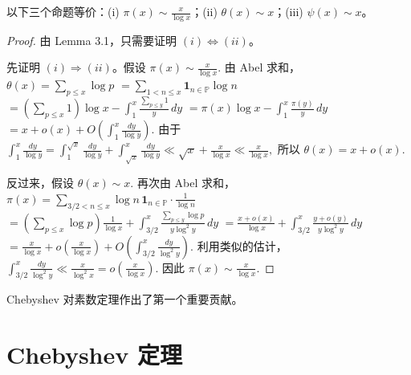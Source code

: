 \begin{theorem}[原文 Theorem 3.2]
	以下三个命题等价：(i) $\pi(x)\sim \frac{x}{\log x}$；(ii) $\theta(x)\sim x$；(iii) $\psi(x)\sim x$。
\end{theorem}

\begin{proof}
	由 Lemma 3.1，只需要证明 $(i)\Longleftrightarrow(ii)$。

	先证明 $(i)\Rightarrow(ii)$。假设
	\(\textstyle \pi(x)\sim\allowbreak{} \frac{x}{\log x}.\)
	由 Abel 求和，
	\(\textstyle \theta(x) =\allowbreak{} \sum_{p\leq\allowbreak{} x}\log p\) \(\textstyle =\allowbreak{} \sum_{1<n\leq\allowbreak{} x}\mathbf 1_{n\in\mathbb P}\log n\) \(\textstyle =\allowbreak{} \left(\sum_{p\leq\allowbreak{} x}1\right)\log x - \int_1^x \frac{\sum_{p\leq\allowbreak{} y}1}{y}\,dy\) \(\textstyle =\allowbreak{} \pi(x)\log x-\int_1^x\frac{\pi(y)}y\,dy\) \(\textstyle =\allowbreak{} x+\allowbreak{}o(x)+\allowbreak{} O\left(\int_1^x\frac{dy}{\log y}\right).\)
	由于
	\(\textstyle \int_1^x\frac{dy}{\log y} =\allowbreak{} \int_1^{\sqrt{x}}\frac{dy}{\log y} +\allowbreak{} \int_{\sqrt{x}}^x\frac{dy}{\log y} \ll\allowbreak{} \sqrt{x}+\allowbreak{}\frac{x}{\log x} \ll\allowbreak{} \frac{x}{\log x},\allowbreak{}\)
	所以
	\(\textstyle \theta(x)=\allowbreak{}x+\allowbreak{}o(x).\)

	反过来，假设
	\(\textstyle \theta(x)\sim\allowbreak{} x.\)
	再次由 Abel 求和，
	\(\textstyle \pi(x) =\allowbreak{} \sum_{3/2<n\leq\allowbreak{} x}\log n\,\mathbf 1_{n\in\mathbb P}\cdot \frac1{\log n}\) \(\textstyle =\allowbreak{} \left(\sum_{p\leq\allowbreak{} x}\log p\right)\frac1{\log x} +\allowbreak{} \int_{3/2}^{x} \frac{\sum_{p\leq\allowbreak{} y}\log p}{y\log^2 y}\,dy\) \(\textstyle =\allowbreak{} \frac{x+\allowbreak{}o(x)}{\log x} +\allowbreak{} \int_{3/2}^{x}\frac{y+\allowbreak{}o(y)}{y\log^2 y}\,dy\) \(\textstyle =\allowbreak{} \frac{x}{\log x}+\allowbreak{}o\left(\frac{x}{\log x}\right) +\allowbreak{} O\left(\int_{3/2}^{x}\frac{dy}{\log^2 y}\right).\)
	利用类似的估计，
	\(\textstyle \int_{3/2}^{x}\frac{dy}{\log^2 y} \ll\allowbreak{} \frac{x}{\log^2 x} =\allowbreak{} o\left(\frac{x}{\log x}\right).\)
	因此
	\(\textstyle \pi(x)\sim\allowbreak{} \frac{x}{\log x}.\)
\end{proof}

Chebyshev 对素数定理作出了第一个重要贡献。

\section{Chebyshev 定理}

